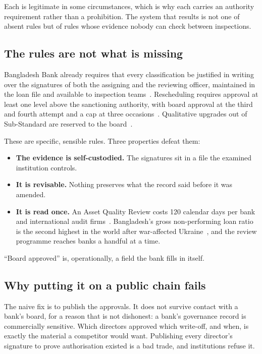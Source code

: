 \documentclass[11pt,a4paper]{article}
\begin{document}
Each is legitimate in some circumstances, which is why each carries an authority requirement rather than
a prohibition. The system that results is not one of absent rules but of rules whose evidence nobody can
check between inspections.

\subsection{The rules are not what is missing}

Bangladesh Bank already requires that every classification be justified in writing over the signatures of
both the assigning and the reviewing officer, maintained in the loan file and available to inspection
teams~\cite[para 11(c)]{brpd15}. Rescheduling requires approval at least one level above the sanctioning
authority, with board approval at the third and fourth attempt and a cap at three
occasions~\cite{prudential}. Qualitative upgrades out of Sub-Standard are reserved to the
board~\cite[para 6(d)]{brpd15}.

These are specific, sensible rules. Three properties defeat them:

\begin{itemize}
  \item \textbf{The evidence is self-custodied.} The signatures sit in a file the examined institution
    controls.
  \item \textbf{It is revisable.} Nothing preserves what the record said before it was amended.
  \item \textbf{It is read once.} An Asset Quality Review costs 120 calendar days per bank and
    international audit firms~\cite{aqr11}. Bangladesh's gross non-performing loan ratio is the second
    highest in the world after war-affected Ukraine~\cite{npl}, and the review programme reaches banks a
    handful at a time.
\end{itemize}

``Board approved'' is, operationally, a field the bank fills in itself.

\subsection{Why putting it on a public chain fails}

The naive fix is to publish the approvals. It does not survive contact with a bank's board, for a reason
that is not dishonest: a bank's governance record is commercially sensitive. Which directors approved
which write-off, and when, is exactly the material a competitor would want. Publishing every director's
signature to prove authorisation existed is a bad trade, and institutions refuse it.
\end{document}

